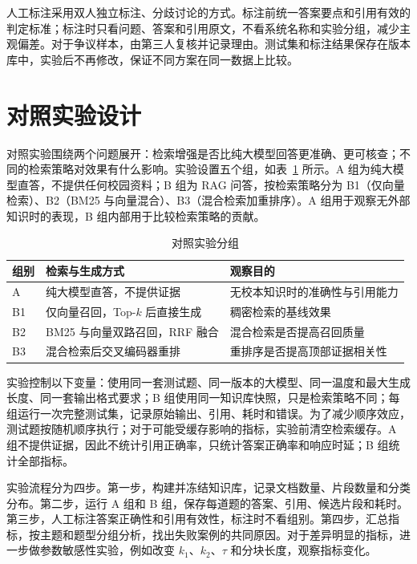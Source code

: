 人工标注采用双人独立标注、分歧讨论的方式。标注前统一答案要点和引用有效的判定标准；标注时只看问题、答案和引用原文，不看系统名称和实验分组，减少主观偏差。对于争议样本，由第三人复核并记录理由。测试集和标注结果保存在版本库中，实验后不再修改，保证不同方案在同一数据上比较。

\section{对照实验设计}
\label{sec:experiment}

对照实验围绕两个问题展开：检索增强是否比纯大模型回答更准确、更可核查；不同的检索策略对效果有什么影响。实验设置五个组，如表~\ref{tab:groups} 所示。A 组为纯大模型直答，不提供任何校园资料；B 组为 RAG 问答，按检索策略分为 B1（仅向量检索）、B2（BM25 与向量混合）、B3（混合检索加重排序）。A 组用于观察无外部知识时的表现，B 组内部用于比较检索策略的贡献。

\begin{table}[H]
  \centering
  \caption{对照实验分组}
  \label{tab:groups}
  \renewcommand{\arraystretch}{1.25}
  \begin{tabular}{p{1.2cm}p{4.4cm}p{6.8cm}}
    \toprule
    组别 & 检索与生成方式 & 观察目的 \\
    \midrule
    A & 纯大模型直答，不提供证据 & 无校本知识时的准确性与引用能力 \\
    B1 & 仅向量召回，Top-$k$ 后直接生成 & 稠密检索的基线效果 \\
    B2 & BM25 与向量双路召回，RRF 融合 & 混合检索是否提高召回质量 \\
    B3 & 混合检索后交叉编码器重排 & 重排序是否提高顶部证据相关性 \\
    \bottomrule
  \end{tabular}
\end{table}

实验控制以下变量：使用同一套测试题、同一版本的大模型、同一温度和最大生成长度、同一套输出格式要求；B 组使用同一知识库快照，只是检索策略不同；每组运行一次完整测试集，记录原始输出、引用、耗时和错误。为了减少顺序效应，测试题按随机顺序执行；对于可能受缓存影响的指标，实验前清空检索缓存。A 组不提供证据，因此不统计引用正确率，只统计答案正确率和响应时延；B 组统计全部指标。

实验流程分为四步。第一步，构建并冻结知识库，记录文档数量、片段数量和分类分布。第二步，运行 A 组和 B 组，保存每道题的答案、引用、候选片段和耗时。第三步，人工标注答案正确性和引用有效性，标注时不看组别。第四步，汇总指标，按主题和题型分组分析，找出失败案例的共同原因。对于差异明显的指标，进一步做参数敏感性实验，例如改变 $k_1$、$k_2$、$\tau$ 和分块长度，观察指标变化。


